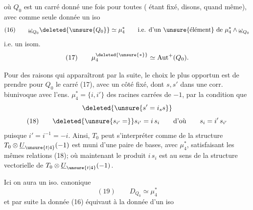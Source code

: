 
où $Q_0$ est un carré donné une fois pour toutes ( étant fixé, disons, quand même), avec comme seule donnée un iso
\[
(16)\qquad \underline{\omega}_{Q_0}\deleted{\unsure{Q_0}}\simeq\mu_4^* \qquad\text{i.e. d'un \unsure{élément} de }\mu_4^*\wedge\underline{\omega}_{Q_0}
\]
i.e. un isom.
\[
(17)\qquad \mu_4^{\deleted{\unsure{*}}}\simeq\operatorname{Aut}^{+}(Q_0).
\]

Pour des raisons qui apparaîtront par la suite, le choix le plus opportun est de prendre pour $Q_0$ le carré  (17), avec un côté fixé, dont  $s,s'$  dans une corr. biunivoque avec l'ens. $\mu_4^*=\{i,i'\}$ des racines carrées de $-1$, par la condition que
\[
\deleted{\unsure{s'=i_s s}}
\]
\[
(18)\qquad \deleted{\unsure{s_{i'}=}}s_{i'}=i\,s_i\qquad\text{d'où}\qquad s_i=i'\,s_{i'}
\]
puisque $i'=i^{-1}=-i$. Ainsi, $T_0$ peut s'interpréter comme  de la structure  $T_0\otimes\underline{U}_{\unsure{t|4}}(-1)$ est muni d'une paire de bases,  avec $\mu_4^*$, satisfaisant les mêmes relations (18); où maintenant le produit $i\,s_i$ est au sens de la structure vectorielle de $T_0\otimes\underline{U}_{\unsure{t|4}}(-1)$. 

Ici on aura un iso. canonique
\[
(19)\qquad D_{Q_0}\simeq\mu_4^*
\]
et par suite la donnée (16) équivaut à la donnée d'un iso

